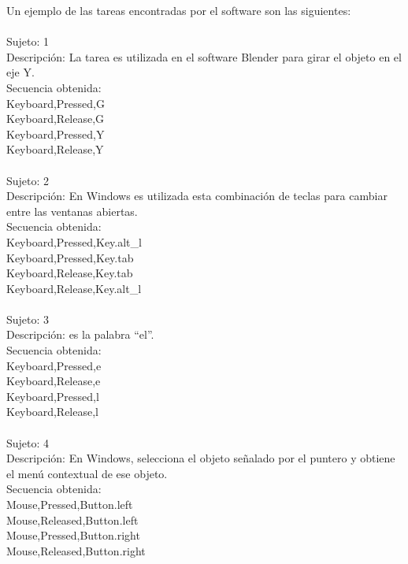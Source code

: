 Un ejemplo de las tareas encontradas por el software son las siguientes:
\\
\\
Sujeto: 1	\\
Descripci\'on: La tarea es utilizada en el software Blender para girar el 
 objeto en el eje Y.	\\
Secuencia obtenida:\\
Keyboard,Pressed,G\\
Keyboard,Release,G\\
Keyboard,Pressed,Y\\
Keyboard,Release,Y\\
\\
Sujeto: 2	\\
Descripci\'on: En Windows es utilizada esta combinaci\'on de teclas para 
 cambiar entre las ventanas abiertas.	\\
Secuencia obtenida:\\
Keyboard,Pressed,Key.alt\_l	\\
Keyboard,Pressed,Key.tab	\\
Keyboard,Release,Key.tab	\\
Keyboard,Release,Key.alt\_l	\\
\\
Sujeto: 3	\\
Descripci\'on: es la palabra ``el''.	\\
Secuencia obtenida:\\
Keyboard,Pressed,e	\\
Keyboard,Release,e	\\
Keyboard,Pressed,l	\\
Keyboard,Release,l	\\
\\
Sujeto: 4	\\
Descripci\'on: En Windows, selecciona el objeto se\~nalado por el puntero y
 obtiene el men\'u contextual de ese objeto.	\\
Secuencia obtenida:\\	
Mouse,Pressed,Button.left	\\
Mouse,Released,Button.left	\\
Mouse,Pressed,Button.right	\\
Mouse,Released,Button.right	\\
